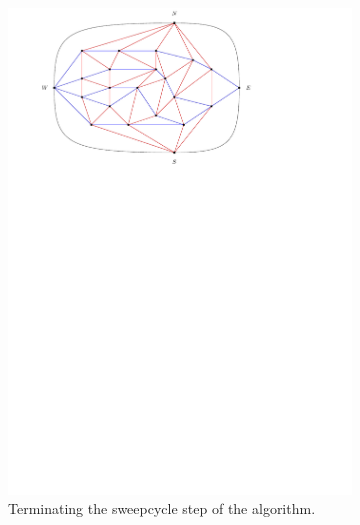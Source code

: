 \begin{figure}
    \centering
    \ContinuedFloat
    \begin{subfigure}[b]{.9 \textwidth}
      \includegraphics[width=\textwidth]{examples/img/smallExample/smallExample-7}
      \caption{Terminating the sweepcycle step of the algorithm.}
      \label{fig:ex:simple:7}
    \end{subfigure}
    ~
    \begin{subfigure}[b]{.9 \textwidth}

\end{subfigure}
\end{figure}
